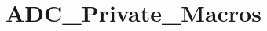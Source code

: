 \hypertarget{group___a_d_c___private___macros}{}\section{A\+D\+C\+\_\+\+Private\+\_\+\+Macros}
\label{group___a_d_c___private___macros}
